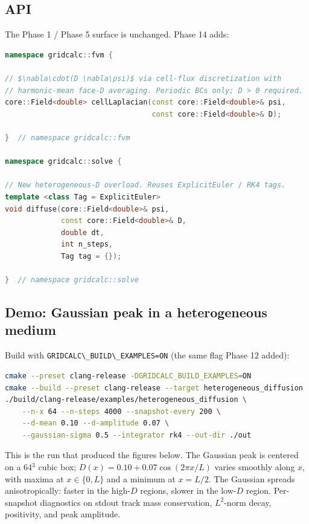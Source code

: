 \subsection{API}\label{phase14-api}

The Phase 1 / Phase 5 surface is unchanged. Phase 14 adds:

\begin{lstlisting}[language={C++}]
namespace gridcalc::fvm {

// $\nabla\cdot(D \nabla\psi)$ via cell-flux discretization with
// harmonic-mean face-D averaging. Periodic BCs only; D > 0 required.
core::Field<double> cellLaplacian(const core::Field<double>& psi,
                                  const core::Field<double>& D);

}  // namespace gridcalc::fvm

namespace gridcalc::solve {

// New heterogeneous-D overload. Reuses ExplicitEuler / RK4 tags.
template <class Tag = ExplicitEuler>
void diffuse(core::Field<double>& psi,
             const core::Field<double>& D,
             double dt,
             int n_steps,
             Tag tag = {});

}  // namespace gridcalc::solve
\end{lstlisting}

\subsection{Demo: Gaussian peak in a heterogeneous
medium}\label{phase14-demo}

Build with \passthrough{\lstinline!GRIDCALC\_BUILD\_EXAMPLES=ON!} (the
same flag Phase 12 added):

\begin{lstlisting}[language=bash]
cmake --preset clang-release -DGRIDCALC_BUILD_EXAMPLES=ON
cmake --build --preset clang-release --target heterogeneous_diffusion
./build/clang-release/examples/heterogeneous_diffusion \
    --n-x 64 --n-steps 4000 --snapshot-every 200 \
    --d-mean 0.10 --d-amplitude 0.07 \
    --gaussian-sigma 0.5 --integrator rk4 --out-dir ./out
\end{lstlisting}

This is the run that produced the figures below. The Gaussian peak is
centered on a 64\(^3\) cubic box; \(D(x) = 0.10 + 0.07\cos(2\pi x/L)\)
varies smoothly along \(x\), with maxima at \(x \in \{0, L\}\) and a
minimum at \(x = L/2\). The Gaussian spreads anisotropically: faster
in the high-\(D\) regions, slower in the low-\(D\) region. Per-snapshot
diagnostics on stdout track mass conservation, \(L^2\)-norm decay,
positivity, and peak amplitude.

